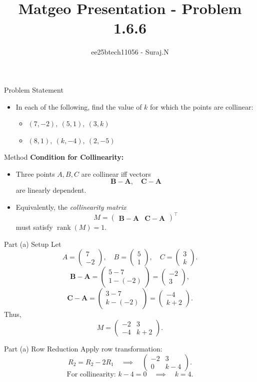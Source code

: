 \documentclass{beamer}
\title{Matgeo Presentation - Problem 1.6.6}
\author{ee25btech11056 - Suraj.N}
\theoremstyle{remark}
\newcommand{\myvec}[1]{\ensuremath{\begin{pmatrix}#1\end{pmatrix}}}
\let\vec\mathbf
\numberwithin{equation}{section}
\begin{document}
\begin{frame}
  \titlepage
\end{frame}

\begin{frame}{Problem Statement}

\begin{itemize}
  \item In each of the following, find the value of $k$ for which the points are collinear:

\begin{itemize}
\item $(7,-2),\ (5,1),\ (3,k)$
\item $(8,1),\ (k,-4),\ (2,-5)$
\end{itemize}

\end{itemize}

\end{frame}

\begin{frame}{Method}
\textbf{Condition for Collinearity:}
\begin{itemize}
\item Three points $A,B,C$ are collinear iff vectors 
\[
\vec{B}-\vec{A}, \quad \vec{C}-\vec{A}
\]
are linearly dependent.
\item Equivalently, the \textit{collinearity matrix}
\[
  M = \myvec{ \vec{B}-\vec{A} & \vec{C}-\vec{A} }^\top
\]
must satisfy $\operatorname{rank}(M)=1$.
\end{itemize}
\end{frame}

\begin{frame}{Part (a) Setup}
Let
\[
A=\myvec{7\\-2}, \quad B=\myvec{5\\1}, \quad C=\myvec{3\\k}.
\]
\[
\vec{B}-\vec{A} = \myvec{5-7\\ 1-(-2)} = \myvec{-2\\3},
\]
\[
\vec{C}-\vec{A} = \myvec{3-7\\ k-(-2)} = \myvec{-4\\k+2}.
\]
Thus,
\[
M = \myvec{-2 & 3\\ -4 & k+2}.
\]
\end{frame}

\begin{frame}{Part (a) Row Reduction}
Apply row transformation:
\[
R_2 = R_2 - 2R_1 \quad \implies \quad
\myvec{-2 & 3\\ 0 & k-4}.
\]
\[
\text{For collinearity: } k-4=0 \quad \implies \quad k=\boxed{4}.
\]
\end{frame}
\end{document}
